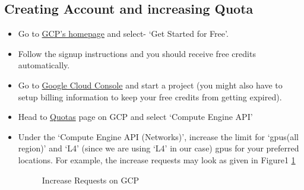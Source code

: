 \documentclass[12pt]{article}
\begin{document}
\subsection{Creating Account and increasing Quota}
\begin{itemize}
	\item
	Go to \href{https://cloud.google.com}{GCP's homepage} and select- `Get Started for Free'.
	
	\item
	Follow the signup instructions and you should receive free credits automatically.
	
	\item
	Go to \href{https://console.cloud.google.com/}{Google Cloud Console} and start a project (you might also have to setup billing information to keep your free credits from getting expired).
	
	\item
	Head to \href{https://console.cloud.google.com/iam-admin/quotas?_ga=2.43326246.2094772927.1720406019-760686455.1700081600&_gac=1.222441065.1720474391.CjwKCAjwnK60BhA9EiwAmpHZw9FxhNBMBVr07uVS5tzDRUb2l4nRARWjSuvP0NW8KQjphSTtuKyUAxoC0W8QAvD_BwE}{Quotas} page on GCP and select `Compute Engine API'
	
	\item
	Under the `Compute Engine API (Networks)', increase the limit for `gpus(all region)' and `L4' (since we are using `L4' in our case) gpus for your preferred locations. For example, the increase requests may look as given in Figure1  
    \ref{fig:gpu_request}

	\begin{figure}
    	\centering
    		\caption{Increase Requests on GCP}
            \label{fig:gpu_request}
	\end{figure}
	
\end{itemize}
\end{document}
